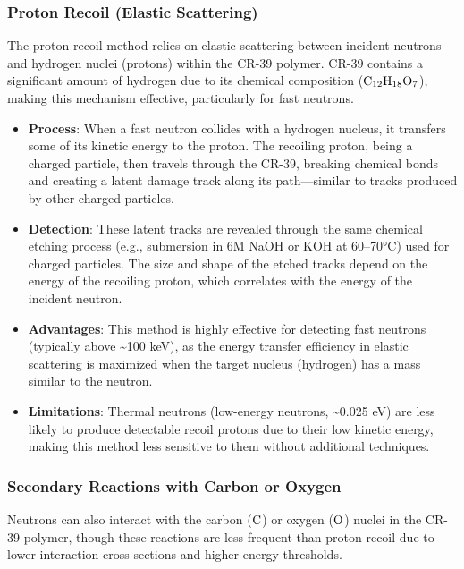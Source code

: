 \documentclass[
]{article}
\renewcommand{\[}{\begin{equation}}
\renewcommand{\]}{\end{equation}}
\providecommand{\tightlist}{%
  \setlength{\itemsep}{0pt}\setlength{\parskip}{0pt}}
\begin{document}
\subsubsection{Proton Recoil (Elastic
Scattering)}\label{proton-recoil-elastic-scattering}

The proton recoil method relies on elastic scattering between incident
neutrons and hydrogen nuclei (protons) within the CR-39 polymer. CR-39
contains a significant amount of hydrogen due to its chemical
composition (\(\rm C_{12} H_{18} O_7\)), making this mechanism
effective, particularly for fast neutrons.

\begin{itemize}
\tightlist
\item
  \textbf{Process}: When a fast neutron collides with a hydrogen
  nucleus, it transfers some of its kinetic energy to the proton. The
  recoiling proton, being a charged particle, then travels through the
  CR-39, breaking chemical bonds and creating a latent damage track
  along its path---similar to tracks produced by other charged
  particles.
\item
  \textbf{Detection}: These latent tracks are revealed through the same
  chemical etching process (e.g., submersion in 6M NaOH or KOH at
  60--70°C) used for charged particles. The size and shape of the etched
  tracks depend on the energy of the recoiling proton, which correlates
  with the energy of the incident neutron.
\item
  \textbf{Advantages}: This method is highly effective for detecting
  fast neutrons (typically above \textasciitilde100 keV), as the energy
  transfer efficiency in elastic scattering is maximized when the target
  nucleus (hydrogen) has a mass similar to the neutron.
\item
  \textbf{Limitations}: Thermal neutrons (low-energy neutrons,
  \textasciitilde0.025 eV) are less likely to produce detectable recoil
  protons due to their low kinetic energy, making this method less
  sensitive to them without additional techniques.
\end{itemize}

\subsubsection{Secondary Reactions with Carbon or
Oxygen}\label{secondary-reactions-with-carbon-or-oxygen}

Neutrons can also interact with the carbon (\(\rm C\)) or oxygen
(\(\rm O\)) nuclei in the CR-39 polymer, though these reactions are less
frequent than proton recoil due to lower interaction cross-sections and
higher energy thresholds.
\end{document}
